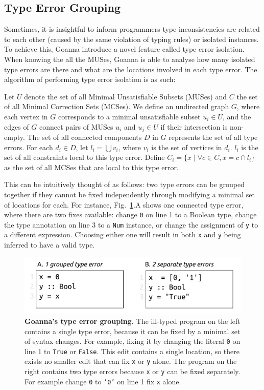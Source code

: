 \documentclass[pdflatex,sn-mathphys-num]{sn-jnl}%
\begin{document}
 
\subsection{Type Error Grouping} \label{sub:grouping}

Sometimes, it is insightful to inform programmers type inconsistencies are related to each other (caused by the same violation of typing rules) or isolated instances. To achieve this, Goanna introduce a novel feature called type error isolation. When knowing the all the MUSes, Goanna is able to analyse how many isolated type errors are there and what are the locations involved in each type error. The algorithm of performing type error isolation is as such:


	Let $U$ denote the set of all Minimal Unsatisfiable Subsets (MUSes) and $C$ the set of all Minimal Correction Sets (MCSes). We define an undirected graph $G$, where each vertex in $G$ corresponds to a minimal unsatisfiable subset $u_i \in U$, and the edges of $G$ connect pairs of MUSes $u_i$ and $u_j \in U$ if their intersection is non-empty. The set of all connected components $D$ in $G$ represents the set of all type errors. For each $d_i \in D$, let $l_i = \bigcup v_i$, where $v_i$ is the set of vertices in $d_i$. $l_i$ is the set of all constraints local to this type error. Define $C_i = \{ x \mid \forall c \in C, x = c \cap l_i \}$ as the set of all MCSes that are local to this type error.


    This can be intuitively thought of as follows: two type errors can be grouped together if they cannot be fixed independently through modifying a minimal set of locations for each. For instance, Fig.~\ref{fig:grouping-example}.A shows one connected type error, where there are two fixes available: change \texttt{0} on line 1 to a Boolean type, change the type annotation on line 3 to a \texttt{Num} instance, or change the assignment of \texttt{y} to a different expression. Choosing either one will result in both \texttt{x} and \texttt{y} being inferred to have a valid type.
    

   \begin{figure}[ht!]
        \centering
        \includegraphics[width=0.8\linewidth]{images/Grouping-Example}
        \caption[Goanna's type error grouping]{\textbf{Goanna's type error grouping.} The ill-typed program on the left contains a single type error, because it can be fixed by a minimal set of syntax changes. For example, fixing it by changing the literal \texttt{0} on line 1 to \texttt{True} or \texttt{False}. This edit contains a single location, so there exists no smaller edit that can fix \texttt{x} or \texttt{y} alone. The program on the right contains two type errors because \texttt{x} or \texttt{y} can be fixed separately. For example change \texttt{0} to \texttt{'0'} on line 1 fix \texttt{x} alone. }
        \label{fig:grouping-example}
    \end{figure}
\end{document}
